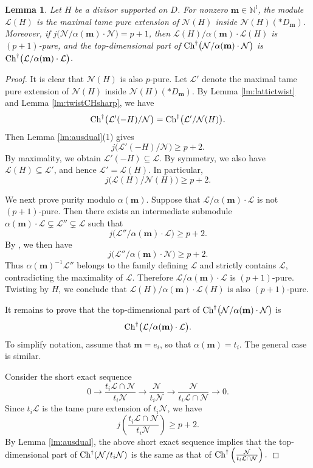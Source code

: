 \documentclass{amsart}
\theoremstyle{plain}
\numberwithin{theorem}{section}
\newtheorem{lemma}[theorem]{Lemma}
\theoremstyle{definition}
\theoremstyle{remark}
\theoremstyle{definition}
\newcommand{\N}{\mathbb{N}}
\newcommand{\cL}{\mathcal{L}}
\newcommand{\cN}{\mathcal{N}}
\newcommand{\bm}{\mathbf{m}}
\newcommand{\Ch}{\textup{Ch}}
\begin{document}
\begin{lemma}\label{lm:tamepurechv}
Let $H$ be a divisor supported on $D$. For nonzero $\bm\in\N^l$, the module
$\cL(H)$ is the maximal tame pure extension of $\cN(H)$ inside
$\cN(H)(*D_\bm)$. Moreover, if
$j\big(\cN/\alpha(\bm)\cdot \cN\big)=p+1$,
then 
$\cL(H)/\alpha(\bm)\cdot \cL(H)$
is $(p+1)$-pure, and the top-dimensional part of $\Ch^\dagger\big(\cN/\alpha(\bm)\cdot \cN\big)$
is
$\Ch^\dagger\big(\cL/\alpha(\bm)\cdot \cL\big)$.
\end{lemma}

\begin{proof}
It is clear that $\cN(H)$ is also $p$-pure. Let $\cL'$ denote the maximal
tame pure extension of $\cN(H)$ inside $\cN(H)(*D_\bm)$. By
Lemma \ref{lm:lattictwist} and Lemma \ref{lm:twistCHsharp}, we have
\[
\Ch^\dagger\big(\cL'(-H)/\cN\big)
=
\Ch^\dagger\big(\cL'/\cN(H)\big).
\]
Then Lemma \ref{lm:ausdual}(1) gives
\[
j\big(\cL'(-H)/\cN\big)\ge p+2.
\]
By maximality, we obtain $\cL'(-H)\subseteq \cL$. By symmetry, we also have
$\cL(H)\subseteq \cL'$, and hence $\cL'=\cL(H)$. In particular,
\[
j\big(\cL(H)/\cN(H)\big)\ge p+2.
\]

We next prove purity modulo $\alpha(\bm)$. Suppose that
$\cL/\alpha(\bm)\cdot\cL$ is not $(p+1)$-pure. Then there exists an
intermediate submodule
$\alpha(\bm)\cdot\cL
\subsetneq
\cL''
\subsetneq
\cL$
such that
\[
j\big(\cL''/\alpha(\bm)\cdot\cL\big)\ge p+2.
\]
By \cite[A.IV 2.3]{BJ}, we then have
\[
j\big(\cL''/\alpha(\bm)\cdot\cN\big)\ge p+2.
\]
Thus $\alpha(\bm)^{-1}\cL''$ belongs to the family defining $\cL$ and
strictly contains $\cL$, contradicting the maximality of $\cL$. Therefore
$\cL/\alpha(\bm)\cdot\cL$ is $(p+1)$-pure. Twisting by $H$, we conclude that
$\cL(H)/\alpha(\bm)\cdot\cL(H)$
is also $(p+1)$-pure.

It remains to prove that the top-dimensional part of
$\Ch^\dagger\big(\cN/\alpha(\bm)\cdot\cN\big)$
is
\[
\Ch^\dagger\big(\cL/\alpha(\bm)\cdot\cL\big).
\]
To simplify notation, assume that $\bm=e_i$, so that $\alpha(\bm)=t_i$.
The general case is similar.

Consider the short exact sequence
\[
0
\to
\frac{t_i\cL\cap \cN}{t_i\cN}
\longrightarrow
\frac{\cN}{t_i\cN}
\longrightarrow
\frac{\cN}{t_i\cL\cap \cN}
\to
0.
\]
Since $t_i\cL$ is the tame pure extension of $t_i\cN$, we have
\[
j\left(\frac{t_i\cL\cap \cN}{t_i\cN}\right)\ge p+2.
\]
By Lemma \ref{lm:ausdual}, the above short exact sequence implies that the
top-dimensional part of $\Ch^\dagger(\cN/t_i\cN)$ is the same as that of
$\Ch^\dagger\left(\frac{\cN}{t_i\cL\cap \cN}\right).$


\end{proof}
\end{document}
